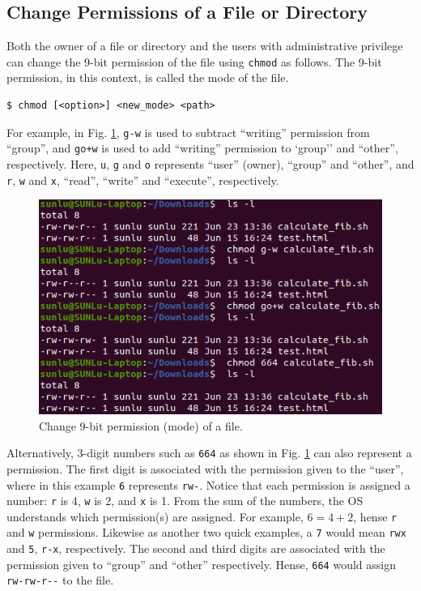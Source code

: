 \subsection{Change Permissions of a File or Directory}

Both the owner of a file or directory and the users with administrative privilege can change the 9-bit permission of the file using \verb|chmod| as follows. The 9-bit permission, in this context, is called the mode of the file.
\begin{lstlisting}
$ chmod [<option>] <new_mode> <path>
\end{lstlisting}
For example, in Fig. \ref{ch:fm:fig:chmodexp}, \verb|g-w| is used to subtract ``writing'' permission from ``group'', and \verb|go+w| is used to add ``writing'' permission to `group'' and ``other'', respectively. Here, \verb|u|, \verb|g| and \verb|o| represents ``user'' (owner), ``group'' and ``other'', and \verb|r|, \verb|w| and \verb|x|, ``read'', ``write'' and ``execute'', respectively.
\begin{figure}
	\centering
	\includegraphics[width=350pt]{chapters/ch-file-management/figures/chmodexp.png}
	\caption{Change 9-bit permission (mode) of a file.} \label{ch:fm:fig:chmodexp}
\end{figure}
Alternatively, 3-digit numbers such as \verb|664| as shown in Fig. \ref{ch:fm:fig:chmodexp} can also represent a permission. The first digit is associated with the permission given to the ``user'', where in this example \verb|6| represents \verb|rw-|. Notice that each permission is assigned a number: \verb|r| is 4, \verb|w| is 2, and \verb|x| is 1. From the sum of the numbers, the OS understands which permission(s) are assigned. For example, $6=4+2$, hense \verb|r| and \verb|w| permissions. Likewise as another two quick examples, a \verb|7| would mean \verb|rwx| and \verb|5|, \verb|r-x|, respectively. The second and third digits are associated with the permission given to ``group'' and ``other'' respectively. Hense, \verb|664| would assign \verb|rw-rw-r--| to the file.

